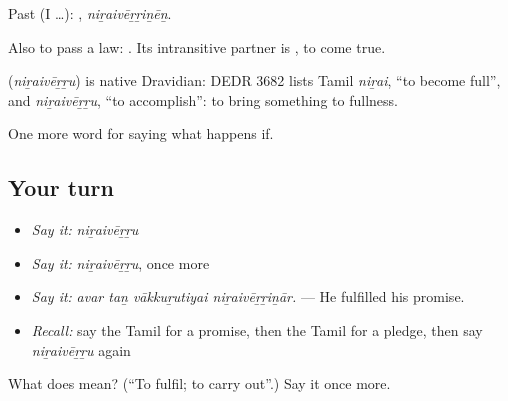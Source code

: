 Past (I …): , \emph{niṟaivēṟṟiṉēṉ}.

Also to pass a law:  . Its intransitive partner is , to come true.

\begin{cousinweb}
\textbf{} (\emph{niṟaivēṟṟu}) is native Dravidian: DEDR 3682 lists Tamil \emph{niṟai}, \textquotedblleft{}to become full\textquotedblright{}, and \emph{niṟaivēṟṟu}, \textquotedblleft{}to accomplish\textquotedblright{}: to bring something to fullness.
\end{cousinweb}

\begin{grammarlens}[title={What you've built}]
One more word for saying what happens if.
\end{grammarlens}

\subsection*{Your turn}
\begin{itemize}
\raggedright
  \item \emph{Say it:} \emph{niṟaivēṟṟu}
  \item \emph{Say it:} \emph{niṟaivēṟṟu}, once more
  \item \emph{Say it:} \emph{avar taṉ vākkuṟutiyai niṟaivēṟṟiṉār.} — He fulfilled his promise.
  \item \emph{Recall:} say the Tamil for a promise, then the Tamil for a pledge, then say \emph{niṟaivēṟṟu} again
\end{itemize}

\begin{tcolorbox}[breakable,colback=teal!4,colframe=teal!35!black,title={Before you move on}]
What does  mean? (\textquotedblleft{}To fulfil; to carry out\textquotedblright{}.) Say it once more.
\end{tcolorbox}
